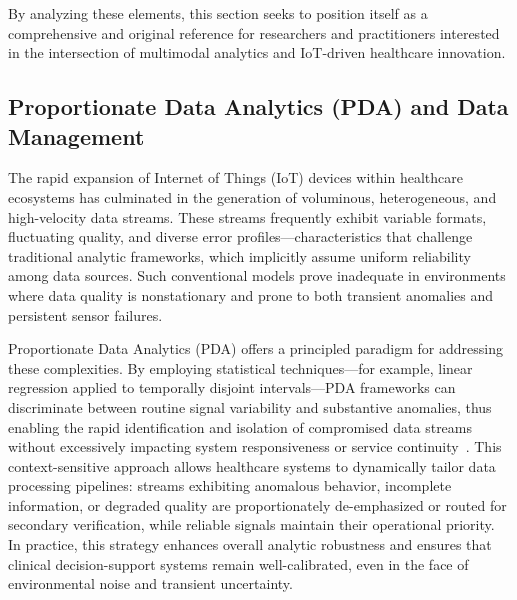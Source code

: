 \documentclass[sigconf]{acmart}
\begin{document}
By analyzing these elements, this section seeks to position itself as a comprehensive and original reference for researchers and practitioners interested in the intersection of multimodal analytics and IoT-driven healthcare innovation.

\subsection{Proportionate Data Analytics (PDA) and Data Management}

The rapid expansion of Internet of Things (IoT) devices within healthcare ecosystems has culminated in the generation of voluminous, heterogeneous, and high-velocity data streams. These streams frequently exhibit variable formats, fluctuating quality, and diverse error profiles---characteristics that challenge traditional analytic frameworks, which implicitly assume uniform reliability among data sources. Such conventional models prove inadequate in environments where data quality is nonstationary and prone to both transient anomalies and persistent sensor failures. 

Proportionate Data Analytics (PDA) offers a principled paradigm for addressing these complexities. By employing statistical techniques---for example, linear regression applied to temporally disjoint intervals---PDA frameworks can discriminate between routine signal variability and substantive anomalies, thus enabling the rapid identification and isolation of compromised data streams without excessively impacting system responsiveness or service continuity~\cite{ref106}. This context-sensitive approach allows healthcare systems to dynamically tailor data processing pipelines: streams exhibiting anomalous behavior, incomplete information, or degraded quality are proportionately de-emphasized or routed for secondary verification, while reliable signals maintain their operational priority. In practice, this strategy enhances overall analytic robustness and ensures that clinical decision-support systems remain well-calibrated, even in the face of environmental noise and transient uncertainty.
\end{document}
